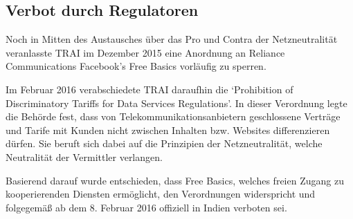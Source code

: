 \documentclass{article}
\begin{document}
	

\subsection{Verbot durch Regulatoren}




Noch in Mitten des Austausches über das Pro und Contra der Netzneutralität veranlasste TRAI im Dezember 2015 eine Anordnung an Reliance Communications Facebook's Free Basics vorläufig zu sperren.
\autocite{Internet governance as 'ideology in practice' - India's 'Free Basics' controversy}

Im Februar 2016 verabschiedete TRAI daraufhin die `Prohibition of Discriminatory Tariffs for Data Services Regulations'.
In dieser Verordnung legte die Behörde fest, dass von Telekommunikationsanbietern geschlossene Verträge und Tarife mit Kunden nicht zwischen Inhalten bzw. Websites differenzieren dürfen. Sie beruft sich dabei auf die Prinzipien der Netzneutralität, welche Neutralität der Vermittler verlangen.

Basierend darauf wurde entschieden, dass Free Basics, welches freien Zugang zu kooperierenden Diensten ermöglicht, den
Verordnungen widerspricht und folgegemäß ab dem 8. Februar 2016 offiziell in Indien verboten sei.

\end{document}
